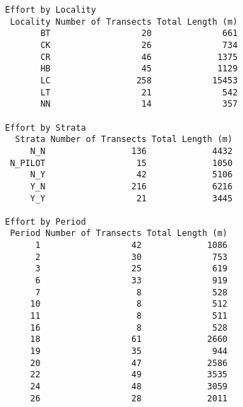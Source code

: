 \documentclass[
]{article}
\begin{document}
\begin{verbatim}
Effort by Locality
 Locality Number of Transects Total Length (m)
       BT                  20              661
       CK                  26              734
       CR                  46             1375
       HB                  45             1129
       LC                 258            15453
       LT                  21              542
       NN                  14              357

Effort by Strata
  Strata Number of Transects Total Length (m)
     N_N                 136             4432
 N_PILOT                  15             1050
     N_Y                  42             5106
     Y_N                 216             6216
     Y_Y                  21             3445

Effort by Period
 Period Number of Transects Total Length (m)
      1                  42             1086
      2                  30              753
      3                  25              619
      6                  33              919
      7                   8              528
     10                   8              512
     11                   8              511
     16                   8              528
     18                  61             2660
     19                  35              944
     20                  47             2586
     22                  49             3535
     24                  48             3059
     26                  28             2011


\end{verbatim}
\end{document}
